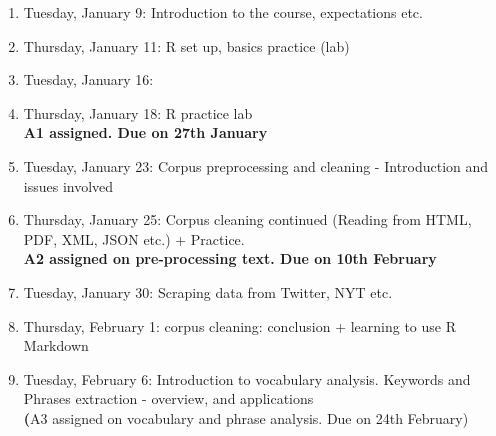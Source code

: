 \documentclass[11pt,a4paper]{article}
\begin{document}
 \begin{enumerate}\itemsep0ex

\item Tuesday, January 9: Introduction to the course, expectations etc. 

\item Thursday, January 11: R set up, basics practice (lab)

\item Tuesday, January 16: 

\item Thursday, January 18:  R practice lab
\\ \textbf{A1 assigned. Due on 27th January}

\item Tuesday, January 23: Corpus preprocessing and cleaning - Introduction and issues involved

\item Thursday, January 25: Corpus cleaning continued (Reading from HTML, PDF, XML, JSON etc.) + Practice. 
\\ \textbf{A2 assigned on pre-processing text. Due on 10th February}

\item Tuesday, January 30: Scraping data from Twitter, NYT etc. 

\item Thursday, February 1: corpus cleaning: conclusion + learning to use R Markdown

\item Tuesday, February 6: Introduction to vocabulary analysis. Keywords and Phrases extraction - overview, and applications
\\ \textbf(A3 assigned on vocabulary and phrase analysis. Due on 24th February)


\end{enumerate}
\end{document}
